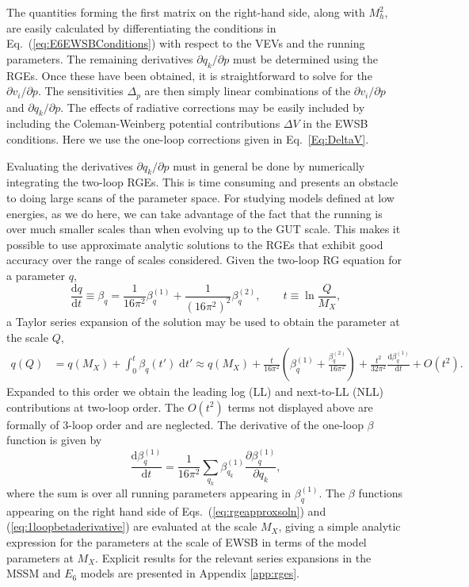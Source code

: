 \documentclass[preprint,amsmath,amssymb,aps,superscriptaddress,prd,
showpacs,floatfix,nofootinbib]{revtex4-1}
\begin{document}
The quantities forming the first matrix on the right-hand side, along
with $M_h^2$, are easily calculated by differentiating the conditions
in Eq.~(\ref{eq:E6EWSBConditions}) with respect to the VEVs and the
running parameters.  The remaining derivatives $\partial q_k /\partial
p$ must be determined using the RGEs.  Once these have been obtained,
it is straightforward to solve for the $\partial v_i / \partial p$.
The sensitivities $\Delta_p$ are then simply linear combinations of
the $\partial v_i / \partial p$ and $\partial q_k / \partial p$.  The
effects of radiative corrections may be easily included by including
the Coleman-Weinberg potential contributions $\Delta V$ in the EWSB
conditions.  Here we use the one-loop corrections given in Eq.~\ref{Eq:DeltaV}.

Evaluating the derivatives $\partial q_k / \partial p$ must in general be
done by numerically integrating the two-loop RGEs.  This is time consuming
and presents an obstacle to doing large scans of the parameter space.  For
studying models defined at low energies, as we do here, we can take advantage
of the fact that the running is over much smaller scales than when
evolving up to the GUT scale.  This makes it possible to use approximate
analytic solutions to the RGEs that exhibit good accuracy over the range of
scales considered.  Given the two-loop RG equation for a parameter $q$,
\begin{equation} \label{eq:rge}
\frac{\textrm{d}q}{\mathrm{d}t} \equiv \beta_q = \frac{1}{16\pi^2}
\beta_q^{(1)} + \frac{1}{(16\pi^2)^2} \beta_q^{(2)} , \qquad t \equiv
\ln \frac{Q}{M_X} ,
\end{equation}
a Taylor series expansion of the solution may be used to obtain the
parameter at the scale $Q$,
\begin{align} \label{eq:rgeapproxsoln}
q(Q) &= q(M_X) + \int_0^t \beta_q(t') \; \textrm{d}t' \approx q(M_X) +
\frac{t}{16\pi^2} \left ( \beta_q^{(1)} + \frac{\beta_q^{(2)}}{16\pi^2}
\right ) + \frac{t^2}{32\pi^2} \frac{\textrm{d}\beta_q^{(1)}}{\textrm{d}t}
+ O(t^2) .
\end{align}
Expanded to this order we obtain the leading log (LL) and next-to-LL
(NLL) contributions at two-loop order.  The $O(t^2)$ terms
not displayed above are formally of 3-loop order and are
neglected. The derivative of the one-loop $\beta$ function is given by
\begin{equation} \label{eq:1loopbetaderivative}
\frac{\textrm{d}\beta_q^{(1)}}{\textrm{d}t} = \frac{1}{16\pi^2} \sum_{q_k}
\beta_{q_k}^{(1)} \frac{\partial \beta_q^{(1)}}{\partial q_k} ,
\end{equation}
where the sum is over all running parameters appearing in
$\beta_q^{(1)}$.  The $\beta$ functions appearing on the right hand side of
Eqs.~(\ref{eq:rgeapproxsoln}) and (\ref{eq:1loopbetaderivative}) are
evaluated at the scale $M_X$, giving a simple analytic expression for the
parameters at the scale of EWSB in terms of the model parameters at $M_X$.
Explicit results for the relevant series expansions in the MSSM and $E_6$
models are presented in Appendix \ref{app:rges}.
\end{document}

